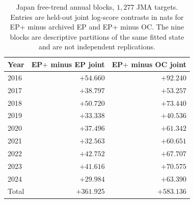 \begin{table}[htbp]\centering\scriptsize
{}
\caption{Japan single-pass transfer, $1{,}277$ JMA targets in three folds. Entries are held-out log-score contrasts in nats; positive favours EP+ over the named archived procedure. \texttt{plane\_T1} is the primary stationary full-plane arm. Joint equals timing plus conditional location because the mark contribution is shared.}
\label{tab:pathway4-japan}
\end{table}

\begin{table}[htbp]\centering\small
\begin{tabular}{@{}lrr@{}}\toprule
Year & EP$+$ minus EP joint & EP$+$ minus OC joint\\\midrule
2016 & $+54.660$ & $+92.240$\\
2017 & $+38.797$ & $+53.257$\\
2018 & $+50.720$ & $+73.440$\\
2019 & $+33.338$ & $+40.536$\\
2020 & $+37.496$ & $+61.342$\\
2021 & $+32.563$ & $+60.651$\\
2022 & $+42.752$ & $+67.707$\\
2023 & $+41.616$ & $+70.575$\\
2024 & $+29.984$ & $+63.390$\\\midrule
Total & $+361.925$ & $+583.136$\\
\bottomrule\end{tabular}
\caption{Japan free-trend annual blocks, $1{,}277$ JMA targets. Entries are held-out joint log-score contrasts in nats for EP+ minus archived EP and EP+ minus OC. The nine blocks are descriptive partitions of the same fitted state and are not independent replications.}
\label{tab:pathway4-japan-annual}
\end{table}


